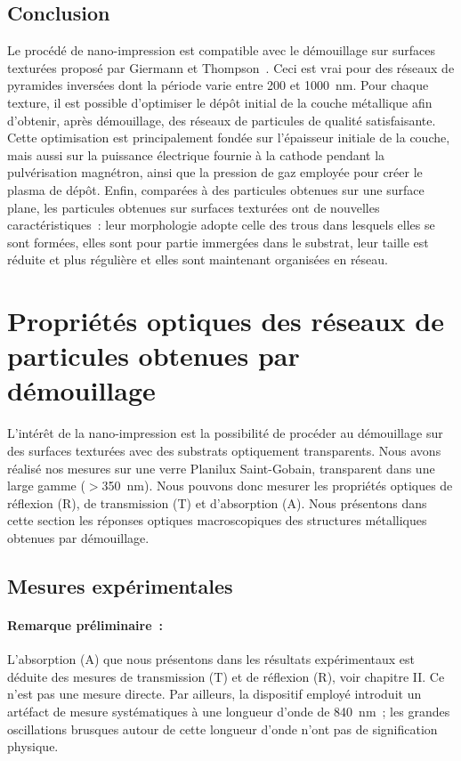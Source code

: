 \subsection{Conclusion}
Le procédé de nano-impression est compatible avec le démouillage sur surfaces texturées proposé par Giermann et Thompson~\cite{giermann2005solid}. Ceci est vrai pour des réseaux de pyramides inversées dont la période varie entre 200 et 1000~nm. Pour chaque texture, il est possible d'optimiser le dépôt initial de la couche métallique afin d'obtenir, après démouillage, des réseaux de particules de qualité satisfaisante. Cette optimisation est principalement fondée sur l'épaisseur initiale de la couche, mais aussi sur la puissance électrique fournie à la cathode pendant la pulvérisation magnétron, ainsi que la pression de gaz employée pour créer le plasma de dépôt. Enfin, comparées à des particules obtenues sur une surface plane, les particules obtenues sur surfaces texturées ont de nouvelles caractéristiques~: leur morphologie adopte celle des trous dans lesquels elles se sont formées, elles sont pour partie immergées dans le substrat, leur taille est réduite et plus régulière et elles sont maintenant organisées en réseau.\par 

\section[Propriétés optiques des réseaux de particules ]{Propriétés optiques des réseaux de particules obtenues par démouillage}
L'intérêt de la nano-impression est la possibilité de procéder au démouillage sur des surfaces texturées avec des substrats optiquement transparents. Nous avons réalisé nos mesures sur une verre Planilux Saint-Gobain, transparent dans une large gamme ($>$350~nm). Nous pouvons donc mesurer les propriétés optiques de réflexion (R), de transmission (T) et d'absorption (A). Nous présentons dans cette section les réponses optiques macroscopiques des structures métalliques obtenues par démouillage.\par 

\subsection{Mesures expérimentales}
\paragraph*{Remarque préliminaire~:} L'absorption (A) que nous présentons dans les résultats expérimentaux est déduite des mesures de transmission (T) et de réflexion (R), voir chapitre II. Ce n'est pas une mesure directe. Par ailleurs, la dispositif employé introduit un artéfact de mesure systématiques à une longueur d'onde de 840~nm~; les grandes oscillations brusques autour de cette longueur d'onde n'ont pas de signification physique.\par 

